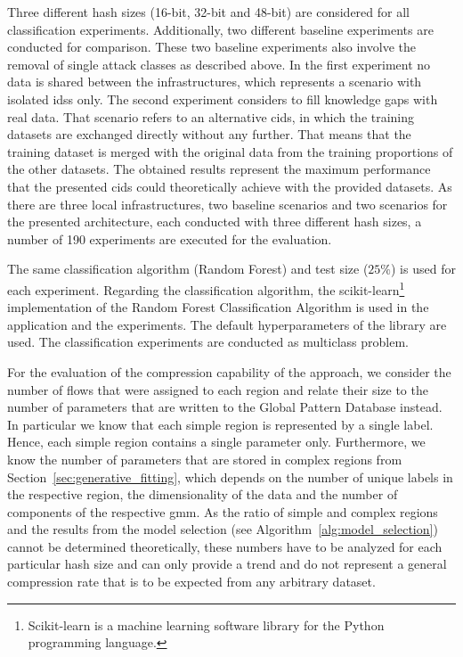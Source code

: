 \documentclass[../../main.tex]{subfiles}
\begin{document}
Three different hash sizes (16-bit, 32-bit and 48-bit) are considered for all classification experiments. Additionally, two different baseline experiments are conducted for comparison. These two baseline experiments also involve the removal of single attack classes as described above. In the first experiment no data is shared between the infrastructures, which represents a scenario with isolated \glspl{ids} only. The second experiment considers to fill knowledge gaps with real data. That scenario refers to an alternative \gls{cids}, in which the training datasets are exchanged directly without any further. That means that the training dataset is merged with the original data from the training proportions of the other datasets. The obtained results represent the maximum performance that the presented \gls{cids} could theoretically achieve with the provided datasets. As there are three local infrastructures, two baseline scenarios and two scenarios for the presented architecture, each conducted with three different hash sizes, a number of 190 experiments are executed for the evaluation.

The same classification algorithm (Random Forest) and test size ($25\%$) is used for each experiment. Regarding the classification algorithm, the scikit-learn\footnote{Scikit-learn is a machine learning software library for the Python programming language.} implementation of the Random Forest Classification Algorithm \cite{breiman2001random} is used in the application and the experiments. The default hyperparameters of the library are used. The classification experiments are conducted as multiclass problem.

For the evaluation of the compression capability of the approach, we consider the number of flows that were assigned to each region and relate their size to the number of parameters that are written to the Global Pattern Database instead. In particular we know that each simple region is represented by a single label. Hence, each simple region contains a single parameter only. Furthermore, we know the number of parameters that are stored in complex regions from Section~\ref{sec:generative_fitting}, which depends on the number of unique labels in the respective region, the dimensionality of the data and the number of components of the respective \gls{gmm}. As the ratio of simple and complex regions and the results from the model selection (see Algorithm~\ref{alg:model_selection}) cannot be determined theoretically, these numbers have to be analyzed for each particular hash size and can only provide a trend and do not represent a general compression rate that is to be expected from any arbitrary dataset. 
\end{document}
